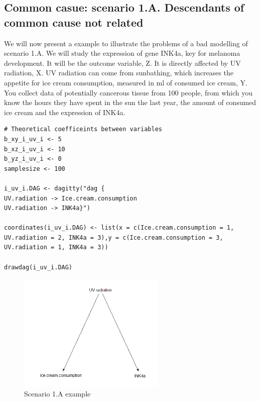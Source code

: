 \documentclass{article}
\begin{document}
\subsection{Common casue: scenario 1.A. Descendants of common cause not related}
We will now present a example to illustrate the problems of a bad modelling of scenario 1.A. We will study the expression of gene INK4a, key for melanoma development. It will be the outcome variable, Z. It is directly affected by UV radiation, X. UV radiation can come from sunbathing, which increases the appetite for ice cream consumption, measured in ml of consumed ice cream, Y. You collect data of potentially cancerous tissue from 100 people, from which you know the hours they have spent in the sun the last year, the amount of consumed ice cream and the expression of INK4a.

\begin{lstlisting}
# Theoretical coefficeints between variables
b_xy_i_uv_i <- 5
b_xz_i_uv_i <- 10
b_yz_i_uv_i <- 0
samplesize <- 100

i_uv_i.DAG <- dagitty("dag {
UV.radiation -> Ice.cream.consumption
UV.radiation -> INK4a}")

coordinates(i_uv_i.DAG) <- list(x = c(Ice.cream.consumption = 1, UV.radiation = 2, INK4a = 3),y = c(Ice.cream.consumption = 3, UV.radiation = 1, INK4a = 3))

drawdag(i_uv_i.DAG)
\end{lstlisting}

\begin{figure}[h]
\caption{Scenario 1.A example}
\includegraphics[width=7cm]{i_uv_i.DAG.png}
\centering
\end{figure}
\end{document}

